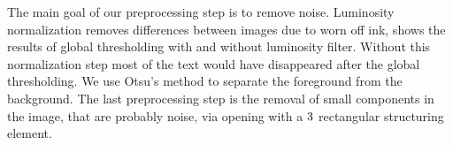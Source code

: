 The main goal of our preprocessing step is to remove noise. 
Luminosity normalization removes differences between images due to worn off ink,  shows the results of global thresholding with and without luminosity filter. Without this normalization step most of the text would have disappeared after the global thresholding. 
We use Otsu's \cite{otsu1975threshold} method to separate the foreground from the background. 
The last preprocessing step is the removal of small components in the image, that are probably noise, via opening with a $3 \time 3$ rectangular structuring element.

